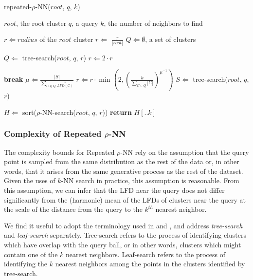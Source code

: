 \begin{algorithm} %
    \caption{repeated-$\rho$-NN($root$, $q$, $k$)} %
    \label{alg:methods:repeated-rnn} %
    \begin{algorithmic} %
        \REQUIRE $root$, the root cluster
        \REQUIRE $q$, a query
        \REQUIRE $k$, the number of neighbors to find

        \STATE $r \Leftarrow radius$ of the $root$ cluster
        \STATE $r \Leftarrow$ $\frac{r}{|root|}$
        \STATE $Q \Leftarrow \emptyset$, a set of clusters

            \STATE $Q \Leftarrow$ tree-search($root$, $q$, $r$)
            \STATE $r \Leftarrow 2 \cdot r$
        \ENDWHILE

        \ALOOP{}
                \STATE \textbf{break}
            \ENDIF
            \STATE $\mu \Leftarrow \frac{|S|}{\sum_{C \in Q} \frac{1}{LFD(C)}}$
            \STATE $r \Leftarrow r \cdot \min \left( 2, \left( {\frac{k}{\sum_{C \in Q} |C|}} \right)^{\mu^{-1}} \right)$
            \STATE $S \Leftarrow$ tree-search($root$, $q$, $r$)
        \ENDLOOP

        \STATE $H \Leftarrow$ sort($\rho$-NN-search($root$, $q$, $r$))
        \STATE \textbf{return} $H[.. k]$
    \end{algorithmic}
\end{algorithm}


\subsubsection{Complexity of Repeated \texorpdfstring{$\rho$}{p}-NN}
\label{sec:methods:knn-search:repeated-rnn-complexity}

The complexity bounds for Repeated $\rho$-NN rely on the assumption that the query point is sampled from the same distribution as the rest of the data or, in other words, that it arises from the same generative process as the rest of the dataset.
Given the uses of $k$-NN search in practice, this assumption is reasonable.
From this assumption, we can infer that the LFD near the query does not differ significantly from the (harmonic) mean of the LFDs of clusters near the query at the scale of the distance from the query to the $k^{th}$ nearest neighbor.

We find it useful to adopt the terminology used in \cite{ishaq2019clustered} and \cite{yu2015entropy}, and address \emph{tree-search} and \emph{leaf-search} separately.
Tree-search refers to the process of identifying clusters which have overlap with the query ball, or in other words, clusters which might contain one of the $k$ nearest neighbors. 
Leaf-search refers to the process of identifying the $k$ nearest neighbors among the points in the clusters identified by tree-search.

